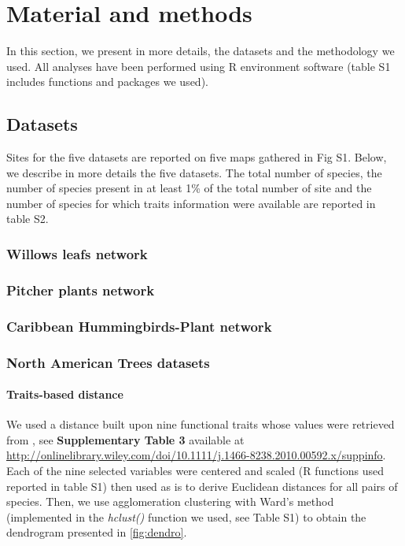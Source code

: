\section{Material and methods}\label{material-and-methods}

In this section, we present in more details, the datasets and the
methodology we used. All analyses have been performed using R
environment software (table S1 includes functions and packages we used).

\subsection{Datasets}\label{datasets}

Sites for the five datasets are reported on five maps gathered in Fig
S1. Below, we describe in more details the five datasets. The total
number of species, the number of species present in at least 1\% of the
total number of site and the number of species for which traits
information were available are reported in table S2.

\subsubsection{Willows leafs network}\label{willows-leafs-network}

\subsubsection{Pitcher plants network}\label{pitcher-plants-network}

\subsubsection{Caribbean Hummingbirds-Plant
network}\label{caribbean-hummingbirds-plant-network}

\subsubsection{North American Trees
datasets}\label{north-american-trees-datasets}

\paragraph{Traits-based distance}\label{traits-based-distance}

We used a distance built upon nine functional traits whose values were
retrieved from \citep{Paquette_2010}, see \textbf{Supplementary Table 3}
available at
\url{http://onlinelibrary.wiley.com/doi/10.1111/j.1466-8238.2010.00592.x/suppinfo}.
Each of the nine selected variables were centered and scaled (R
functions used reported in table S1) then used as is to derive Euclidean
distances for all pairs of species. Then, we use agglomeration
clustering with Ward's method (implemented in the \emph{hclust()}
function we used, see Table S1) to obtain the dendrogram presented in
\ref{fig:dendro}.

